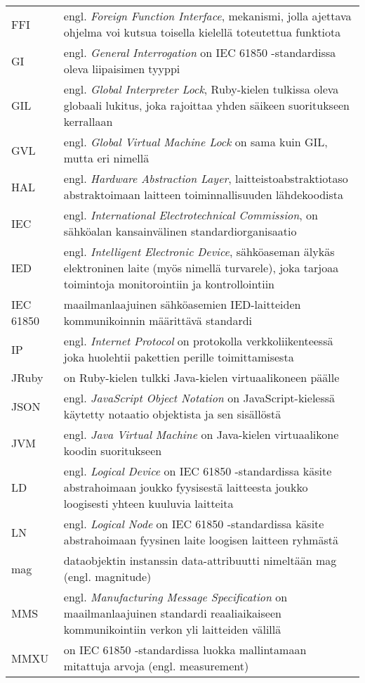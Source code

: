 \begin{tabularx}{\linewidth}[h]{@{} p{} p{} @{}}
	FFI & engl. \emph{Foreign Function Interface}, mekanismi, jolla ajettava ohjelma voi kutsua toisella kielellä toteutettua funktiota \\
	GI & engl. \emph{General Interrogation} on IEC 61850 -standardissa oleva liipaisimen tyyppi \\
	GIL & engl. \emph{Global Interpreter Lock}, Ruby-kielen tulkissa oleva globaali lukitus, joka rajoittaa yhden säikeen suoritukseen kerrallaan \\
	GVL & engl. \emph{Global Virtual Machine Lock} on sama kuin GIL, mutta eri nimellä \\
	HAL & engl. \emph{Hardware Abstraction Layer}, laitteistoabstraktiotaso abstraktoimaan laitteen toiminnallisuuden lähdekoodista \\
	IEC & engl. \emph{International Electrotechnical Commission}, on sähköalan kansainvälinen standardiorganisaatio \\
	IED & engl. \emph{Intelligent Electronic Device}, sähköaseman älykäs elektroninen laite (myös nimellä turvarele), joka tarjoaa toimintoja monitorointiin ja kontrollointiin \\
	IEC 61850 & maailmanlaajuinen sähköasemien IED-laitteiden kommunikoinnin määrittävä standardi \\
	IP & engl. \emph{Internet Protocol} on protokolla verkkoliikenteessä joka huolehtii pakettien perille toimittamisesta \\
	JRuby & on Ruby-kielen tulkki Java-kielen virtuaalikoneen päälle \\
	JSON & engl. \emph{JavaScript Object Notation} on JavaScript-kielessä käytetty notaatio objektista ja sen sisällöstä \\
	JVM & engl. \emph{Java Virtual Machine} on Java-kielen virtuaalikone koodin suoritukseen \\
	LD & engl. \emph{Logical Device} on IEC 61850 -standardissa käsite abstrahoimaan joukko fyysisestä laitteesta joukko loogisesti yhteen kuuluvia laitteita \\
	LN & engl. \emph{Logical Node} on IEC 61850 -standardissa käsite abstrahoimaan fyysinen laite loogisen laitteen ryhmästä \\
	mag & dataobjektin instanssin data-attribuutti nimeltään mag (engl. magnitude) \\
	MMS & engl. \emph{Manufacturing Message Specification} on maailmanlaajuinen standardi reaaliaikaiseen kommunikointiin verkon yli laitteiden välillä \\
	MMXU & on IEC 61850 -standardissa luokka mallintamaan mitattuja arvoja (engl. measurement) \\

\end{tabularx}
